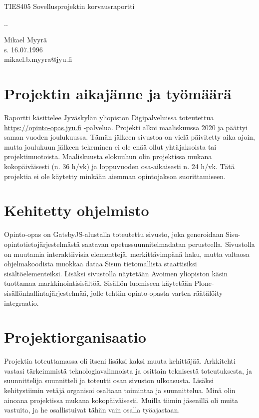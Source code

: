 \documentclass{article}
\begin{document}
\begin{center}
\vspace{2cm}
\LARGE
TIES405 Sovellusprojektin korvausraportti

\vspace{10pt}
\large
\number\day.\number\month.\number\year

\vspace{10pt}
Mikael Myyrä \\
s. 16.07.1996\\
mikael.b.myyra@jyu.fi\\
\end{center}
\vspace{10pt}

\section{Projektin aikajänne ja työmäärä}

Raportti käsittelee Jyväskylän yliopiston Digipalveluissa toteutettua
\url{https://opinto-opas.jyu.fi} -palvelua.  Projekti alkoi maaliskuussa 2020
ja päättyi saman vuoden joulukuussa. Tämän jälkeen sivustoa on vielä päivitetty
aika ajoin, mutta joulukuun jälkeen tekeminen ei ole enää ollut yhtäjaksoista
tai projektimuotoista. Maaliskuusta elokuuhun olin projektissa mukana
kokopäiväisesti (n. 36 h/vk) ja loppuvuoden osa-aikaisesti n. 24 h/vk. Tätä
projektia ei ole käytetty minkään aiemman opintojakson suorittamiseen.

\section{Kehitetty ohjelmisto}

Opinto-opas on GatsbyJS-alustalla toteutettu sivusto, joka
generoidaan Sisu-opintotieto\-järjestel\-mästä saatavan opetussuunnitelmadatan
perusteella. Sivustolla on muutamia interaktiivisia elementtejä,
merkittävimpänä haku, mutta valtaosa ohjelmakoodista muokkaa dataa Sisun
tieto\-mallista staattisiksi sisältöelementeiksi. Lisäksi sivustolla näytetään
Avoimen yliopiston käsin tuottamaa markkinointisisältöä. Sisällön luomiseen
käytetään Plone-sisällönhallintajärjestelmää, jolle tehtiin opinto-opasta varten
räätälöity integraatio.

\section{Projektiorganisaatio}

Projektia toteuttamassa oli itseni lisäksi kaksi muuta kehittäjää. Arkkitehti
vastasi tärkeimmistä teknologiavalinnoista ja osittain teknisestä toteutuksesta,
ja suunnittelija suunnitteli ja toteutti osan sivuston ulkoasusta.
Lisäksi kehitystiimin vetäjä organisoi osaltaan toimintaa ja suunnittelua.
Minä olin ainoana projektissa mukana kokopäiväisesti. Muilla tiimin jäsenillä
oli muita vastuita, ja he osallistuivat tähän vain osalla työajastaan.
\end{document}
